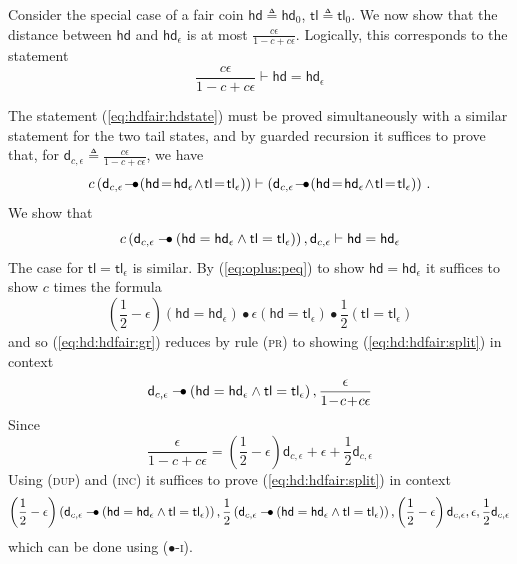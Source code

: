 \documentclass[a4paper,UKenglish,cleveref, autoref, thm-restate]{lipics-v2021}
\newcommand{\ts}{\vdash}
\newcommand{\hdstate}[1][\epsilon]{\textsf{hd}_{#1}}
\newcommand{\tlstate}[1][\epsilon]{\textsf{tl}_{#1}}
\newcommand{\hdfair}{\textsf{hd}}
\newcommand{\tlfair}{\textsf{tl}}
\newcommand{\ltensor}{*}
\renewcommand{\ltensor}{\bullet}
\newcommand{\lexp}{\mathbin{{-}\kern-.2em\raisebox{0ex}{$*$}}}
\renewcommand{\lexp}{\mathbin{{-}\kern-.2em\raisebox{0ex}{$\bullet$}}}
\newcommand{\conj}{\wedge}
\newcommand{\discfact}{c} %
\newcommand{\peq}{=}
\newcommand{\defeq}{\triangleq}
\begin{document}
Consider the special case of a fair coin $\hdfair \defeq \hdstate[0]$, $\tlfair \defeq \tlstate[0]$. 
We now show that the distance between $\hdfair$ and $\hdstate$ is at most 
$\frac{\discfact\epsilon}{1-\discfact+\discfact \epsilon}$. Logically, this corresponds to the statement 
\begin{equation} \label{eq:hdfair:hdstate}
 \frac{\discfact\epsilon}{1-\discfact+\discfact \epsilon} \ts \hdfair \peq \hdstate  
\end{equation}

The statement (\ref{eq:hdfair:hdstate}) must be proved simultaneously with a similar statement for the two tail
states, and by guarded recursion it suffices to prove that, for $\mathsf{d}_{c,\epsilon} \defeq \frac{\discfact\epsilon}{1-\discfact+\discfact \epsilon}$, we have
\[
 \discfact\left( \mathsf{d}_{c,\epsilon} \!\lexp\! \left(\hdfair\! \peq\! \hdstate \!\conj\! \tlfair\! \peq\! \tlstate\right) \right) 
 \ts 
 \left( \mathsf{d}_{c,\epsilon}\! \lexp\! \left(\hdfair \!\peq\! \hdstate \!\conj\! \tlfair\! \peq\! \tlstate\right) \right) \,.
\]
We show that 
\begin{equation} \label{eq:hd:hdfair:gr}
 \discfact\left( \mathsf{d}_{c,\epsilon} \lexp \left(\hdfair \peq \hdstate \conj \tlfair \peq \tlstate\right) \right),
  \mathsf{d}_{c,\epsilon} 
 \ts 
 \hdfair \peq \hdstate
\end{equation}
The case for $\tlfair \peq \tlstate$ is similar. 
By (\ref{eq:oplus:peq}) to show $\hdfair \peq \hdstate$ it suffices to show $\discfact$ times the formula %
\begin{equation} \label{eq:hd:hdfair:split}
  \left(\frac12-\epsilon\right)(\hdfair \peq \hdstate) \ltensor \epsilon(\hdfair \peq \tlstate) \ltensor \frac12(\tlfair \peq \tlstate)%
\end{equation}
and so (\ref{eq:hd:hdfair:gr}) reduces by rule (\textsc{pr}) to showing (\ref{eq:hd:hdfair:split}) in context 
\begin{equation} \label{eq:hd:hdfair:reduced}
  \mathsf{d}_{c,\epsilon} \lexp \left(\hdfair \peq \hdstate \conj \tlfair \peq \tlstate\right) ,
  \frac{\epsilon}{1\!-\!\discfact\!+\!\discfact \epsilon}
\end{equation}
Since
\[
 \frac{\epsilon}{1\!-\!\discfact\!+\!\discfact \epsilon} = \left(\frac12-\epsilon\right)\mathsf{d}_{c,\epsilon} + \epsilon + \frac12 \mathsf{d}_{c,\epsilon}
\]
Using (\textsc{dup}) and (\textsc{inc})  it suffices to prove (\ref{eq:hd:hdfair:split}) in context 
\begin{equation*} %
  \left(\frac12-\epsilon\right)\left(\mathsf{d}_{c,\epsilon} \lexp \left(\hdfair \peq \hdstate \conj \tlfair \peq \tlstate\right)\right) ,
  \frac12\left(\mathsf{d}_{c,\epsilon} \lexp \left(\hdfair \peq \hdstate \conj \tlfair \peq \tlstate\right)\right) ,
  \left(\frac12-\epsilon\right)\mathsf{d}_{c,\epsilon},  \epsilon, \frac12 \mathsf{d}_{c,\epsilon}
\end{equation*}
which can be done using (\textsc{$\ltensor$-i}).
\end{document}

